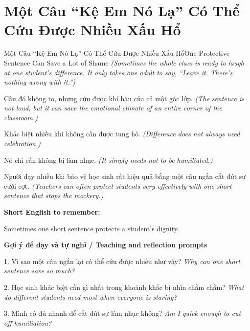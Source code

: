 \section{Một Câu “Kệ Em Nó Lạ” Có Thể Cứu Được Nhiều Xấu Hổ}
\begin{truyen}{Một Câu “Kệ Em Nó Lạ” Có Thể Cứu Được Nhiều Xấu Hổ}{One Protective Sentence Can Save a Lot of Shame}
\textit{(Sometimes the whole class is ready to laugh at one student's difference. It only takes one adult to say, “Leave it. There's nothing wrong with it.”)}

Câu đó không to, nhưng cứu được khí hậu của cả một góc lớp.
\textit{(The sentence is not loud, but it can save the emotional climate of an entire corner of the classroom.)}

Khác biệt nhiều khi không cần được tung hô.
\textit{(Difference does not always need celebration.)}

Nó chỉ cần không bị làm nhục.
\textit{(It simply needs not to be humiliated.)}

\end{truyen}

\begin{baihoc}
Người dạy nhiều khi bảo vệ học sinh rất hiệu quả bằng một câu ngắn cắt đứt sự cười cợt.
\textit{(Teachers can often protect students very effectively with one short sentence that stops the mockery.)}
\end{baihoc}

\begin{ghinhoanh}
\textbf{Short English to remember:}

Sometimes one short sentence protects a student's dignity.

\end{ghinhoanh}

\begin{tuhocnhanh}
\textbf{Gợi ý để dạy và tự nghĩ / Teaching and reflection prompts}

1. Vì sao một câu ngắn lại có thể cứu được nhiều như vậy? \textit{Why can one short sentence save so much?}

2. Học sinh khác biệt cần gì nhất trong khoảnh khắc bị nhìn chằm chằm? \textit{What do different students need most when everyone is staring?}

3. Mình có đủ nhanh để cắt đứt sự làm nhục không? \textit{Am I quick enough to cut off humiliation?}
\end{tuhocnhanh}
\ngancach

